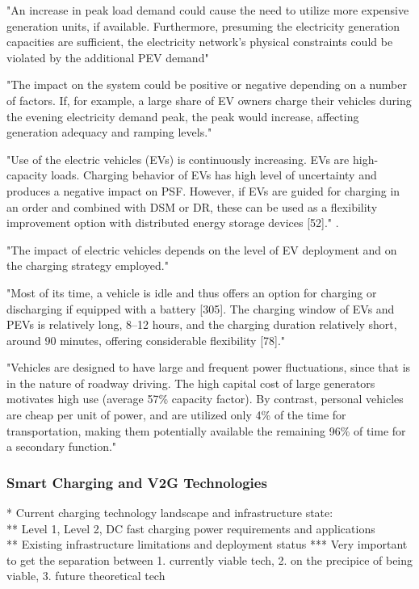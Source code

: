 "An increase in peak load demand could cause the need to utilize more expensive generation units, if available. Furthermore, presuming the electricity generation capacities are sufficient, the electricity network's physical constraints could be violated by the additional PEV demand" \cite{rashid_a_waraich_plug-hybrid_2013}

"The impact on the system could be positive or negative depending on a number of factors. If, for example, a large share of EV owners charge their vehicles during the evening electricity demand peak, the peak would increase, affecting generation adequacy and ramping levels." \cite{emanuele_taibi_power_2018}

"Use of the electric vehicles (EVs) is continuously increasing. EVs are high-capacity loads. Charging behavior of EVs has high level of uncertainty and produces a negative impact on PSF. However, if EVs are guided for charging in an order and combined with DSM or DR, these can be used as a flexibility improvement option with distributed energy storage devices [52]." \cite{kaushik_comprehensive_2022}.

"The impact of electric vehicles depends on the level of EV deployment and on the charging strategy employed." \cite{emanuele_taibi_power_2018}

"Most of its time, a vehicle is idle and thus offers an option for charging or discharging if equipped with a battery [305]. The charging window of EVs and PEVs is relatively long, 8–12 hours, and the charging duration relatively short, around 90 minutes, offering considerable flexibility [78]." \cite{lund_review_2015}

"Vehicles are designed to have large and frequent power fluctuations, since that is in the nature of roadway driving. The high capital cost of large generators motivates high use (average 57\% capacity factor). By contrast, personal vehicles are cheap per unit of power, and are utilized only 4\% of the time for transportation, making them potentially available the remaining 96\% of time for a secondary function." \cite{kempton_vehicle--grid_2005}


\subsubsection{Smart Charging and V2G Technologies}


* Current charging technology landscape and infrastructure state: \\
** Level 1, Level 2, DC fast charging power requirements and applications \\
** Existing infrastructure limitations and deployment status 
*** Very important to get the separation between 1. currently viable tech, 2. on the precipice of being viable, 3. future theoretical tech

